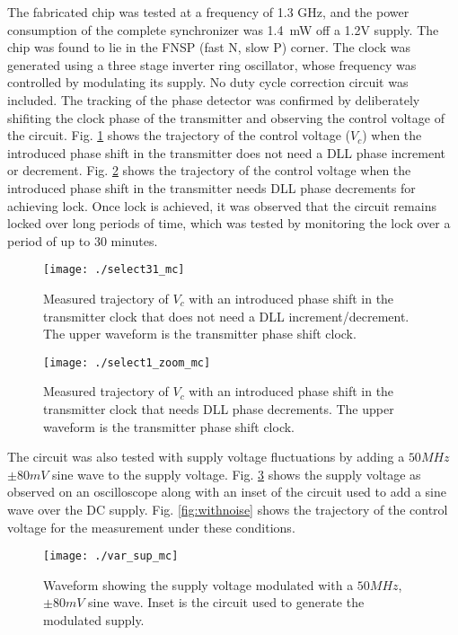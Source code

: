 \documentclass[journal,twoside,letterpaper]{IEEEtran}
\begin{document}
The fabricated chip was tested at a frequency of 1.3 GHz, and
the power consumption of the complete synchronizer was \mbox{1.4 mW}
off a 1.2V supply. 
The chip was found to lie in the FNSP (fast N, slow P) corner.
The clock was generated using a three stage inverter ring oscillator,
whose frequency was controlled by modulating its supply.
No duty cycle correction circuit was included.
The tracking of the phase detector
was confirmed by deliberately shifiting the clock
phase of the transmitter and observing the control voltage 
of the circuit.
Fig. \ref{fig:nojump}
shows the trajectory of the control voltage ($V_c$)
when the introduced phase shift in the transmitter does not need
a DLL phase increment or decrement. Fig. \ref{fig:withjump} shows the 
trajectory of the control voltage when the introduced phase shift in the
transmitter needs DLL phase decrements for achieving lock. Once 
lock is achieved, it was observed that the circuit remains locked
over long periods of time, 
which was tested by monitoring the lock over 
a period of up to 30 minutes.

\begin{figure}[h!]
\centering
\texttt{[image: ./select31\_mc]}
\caption{Measured trajectory of $V_c$ with an introduced
 phase shift in the transmitter clock that 
does not need a DLL increment/decrement. The upper waveform is the
transmitter phase shift clock.}
\label{fig:nojump}
\end{figure}

\begin{figure}[h!]
\centering
\texttt{[image: ./select1\_zoom\_mc]}
\caption{Measured trajectory of $V_c$ with an introduced
phase shift in the transmitter clock that 
needs DLL phase decrements. The upper waveform is the transmitter
phase shift clock.}
\label{fig:withjump}
\end{figure}

The circuit was also tested with supply voltage fluctuations 
by adding a $50 MHz$ $\pm 80mV$ sine wave to the supply voltage.
Fig. \ref{fig:supply_nw} shows the supply voltage as observed on an
oscilloscope along with an inset of the circuit used to add a 
sine wave over the DC supply. 
Fig. \ref{fig:withnoise} shows the trajectory of the control voltage for 
the measurement under these conditions.

\begin{figure}[h!]
\centering
\texttt{[image: ./var\_sup\_mc]}
\caption{Waveform showing the supply voltage modulated with a $50 MHz$, 
$\pm 80mV$ sine wave. Inset is the circuit used to generate the 
modulated supply.}
\label{fig:supply_nw}
\end{figure}
\end{document}
